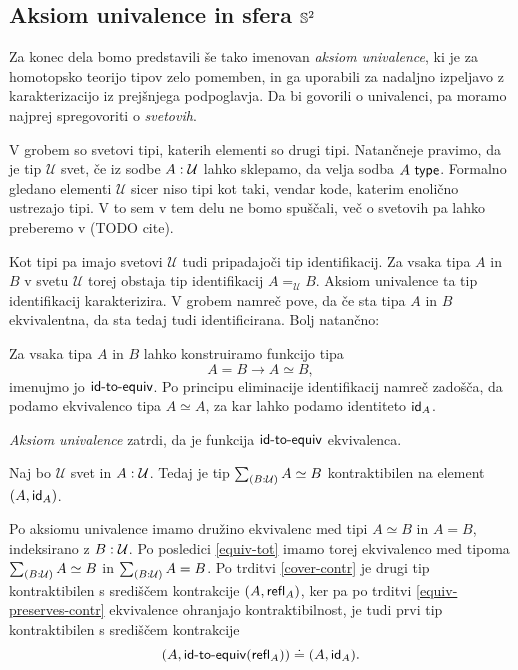 \subsection{Aksiom univalence in sfera \(\mathbb{S}^{2}\)}

Za konec dela bomo predstavili še tako imenovan \emph{aksiom univalence}, ki je za homotopsko teorijo tipov zelo pomemben, in ga uporabili za nadaljno izpeljavo z karakterizacijo iz prejšnjega podpoglavja. Da bi govorili o univalenci, pa moramo najprej spregovoriti o \emph{svetovih}.

V grobem so svetovi tipi, katerih elementi so drugi tipi. Natančneje pravimo, da je tip \(\mathcal{U}\) svet, če iz sodbe \(A : \mathcal{U}\) lahko sklepamo, da velja sodba \(A\ \textnormal{\textsf{type}}\). Formalno gledano elementi \(\mathcal{U}\) sicer niso tipi kot taki, vendar kode, katerim enolično ustrezajo tipi. V to sem v tem delu ne bomo spuščali, več o svetovih pa lahko preberemo v (TODO cite).

Kot tipi pa imajo svetovi \(\mathcal{U}\) tudi pripadajoči tip identifikacij. Za vsaka tipa \(A\) in \(B\) v svetu \(\mathcal{U}\) torej obstaja tip identifikacij \(A =_{\mathcal{U}} B\). Aksiom univalence ta tip identifikacij karakterizira. V grobem namreč pove, da če sta tipa \(A\) in \(B\) ekvivalentna, da sta tedaj tudi identificirana. Bolj natančno:

\begin{definicija}
  Za vsaka tipa \(A\) in \(B\) lahko konstruiramo funkcijo tipa \[A = B \to A \simeq B,\]
  imenujmo jo \(\textnormal{\textsf{id-to-equiv}}\).
  Po principu eliminacije identifikacij namreč zadošča, da podamo ekvivalenco tipa \(A \simeq A\), za kar lahko podamo identiteto \(\textnormal{\textsf{id}}_{A}\).

  \emph{Aksiom univalence} zatrdi, da je funkcija \(\textnormal{\textsf{id-to-equiv}}\) ekvivalenca.
\end{definicija}

\begin{posledica}
  \label{univ-contr}
  Naj bo \(\mathcal{U}\) svet in \(A : \mathcal{U}\). Tedaj je tip \(\textstyle \sum_{\left( B : \mathcal{U} \right)} A \simeq B\) kontraktibilen na element \((A, \textnormal{\textsf{id}}_{A})\).
\end{posledica}

\begin{dokaz}
  Po aksiomu univalence imamo družino ekvivalenc med tipi \(A \simeq B\) in \(A = B\), indeksirano z \(B : \mathcal{U}\). Po posledici \ref{equiv-tot} imamo torej ekvivalenco med tipoma \(\textstyle \sum_{\left( B : \mathcal{U} \right)} A \simeq B\) in \(\textstyle \sum_{\left( B : \mathcal{U} \right)} A = B\).
  Po trditvi \ref{cover-contr} je drugi tip kontraktibilen s središčem kontrakcije \((A, \textnormal{\textsf{refl}}_{A})\), ker pa po trditvi \ref{equiv-preserves-contr} ekvivalence ohranjajo kontraktibilnost, je tudi prvi tip kontraktibilen s središčem kontrakcije
  \[(A, \textnormal{\textsf{id-to-equiv}}(\textnormal{\textsf{refl}}_{A})) \doteq (A, \textnormal{\textsf{id}}_{A}).\]
\end{dokaz}

